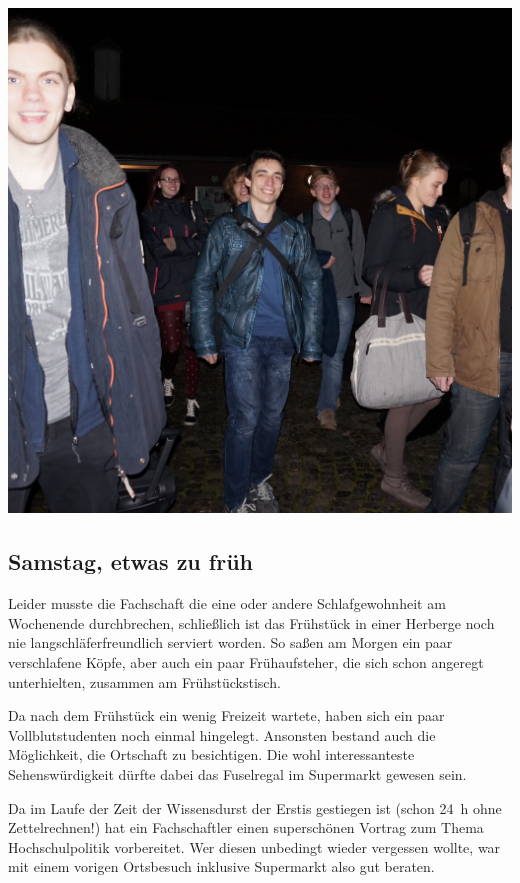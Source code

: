 \begin{multicols*}{2}
\begin{center}
	\includegraphics[width=\columnwidth, height=0.3\textheight]{res/erstiwe/ankunft_cropped.jpg}
\end{center}

\subsection{Samstag, etwas zu früh}
Leider musste die Fachschaft die eine oder andere Schlafgewohnheit am Wochenende durchbrechen, schließlich ist das Frühstück in einer Herberge noch nie langschläferfreundlich serviert worden.
So saßen am Morgen ein paar verschlafene Köpfe, aber auch ein paar Frühaufsteher, die sich schon angeregt unterhielten, zusammen am Frühstückstisch.

Da nach dem Frühstück ein wenig Freizeit wartete, haben sich ein paar Vollblutstudenten noch einmal hingelegt.
Ansonsten bestand auch die Möglichkeit, die Ortschaft zu besichtigen.
Die wohl interessanteste Sehenswürdigkeit dürfte dabei das Fuselregal im Supermarkt gewesen sein.

Da im Laufe der Zeit der Wissensdurst der Erstis gestiegen ist (schon \SI{24}{\hour} ohne Zettelrechnen!) hat ein Fachschaftler einen superschönen Vortrag zum Thema Hochschulpolitik vorbereitet.
Wer diesen unbedingt wieder vergessen wollte, war mit einem vorigen Ortsbesuch inklusive Supermarkt also gut beraten.


\end{multicols*}
